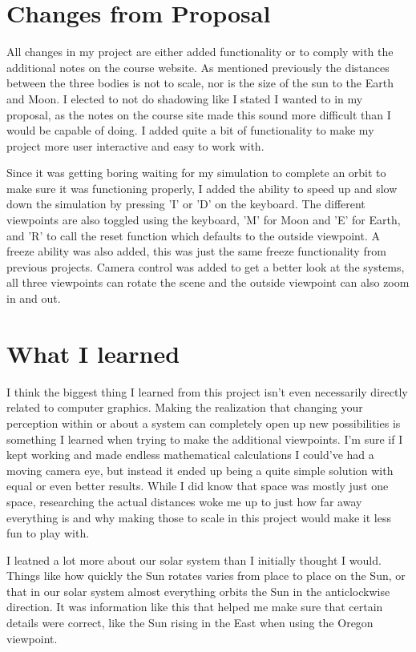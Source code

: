 \documentclass[12pt,serif,draftclsnofoot,onecolumn]{IEEEtran}
\begin{document}
	\section{Changes from Proposal}
	\par
			All changes in my project are either added functionality or to comply with the additional notes on the course website. As mentioned previously the distances between the three bodies is not to scale, nor is the size of the sun to the Earth and Moon. I elected to not do shadowing like I stated I wanted to in my proposal, as the notes on the course site made this sound more difficult than I would be capable of doing. I added quite a bit of functionality to make my project more user interactive and easy to work with.
	\newline
	\par
			Since it was getting boring waiting for my simulation to complete an orbit to make sure it was functioning properly, I added the ability to speed up and slow down the simulation by pressing 'I' or 'D' on the keyboard. The different viewpoints are also toggled using the keyboard, 'M' for Moon and 'E' for Earth, and 'R' to call the reset function which defaults to the outside viewpoint. A freeze ability was also added, this was just the same freeze functionality from previous projects. Camera control was added to get a better look at the systems, all three viewpoints can rotate the scene and the outside viewpoint can also zoom in and out.			
	\newline
	\section{What I learned}
	\par
			I think the biggest thing I learned from this project isn't even necessarily directly related to computer graphics. Making the realization that changing your perception within or about a system can completely open up new possibilities is something I learned when trying to make the additional viewpoints. I'm sure if I kept working and made endless mathematical calculations I could've had a moving camera eye, but instead it ended up being a quite simple solution with equal or even better results. While I did know that space was mostly just one space, researching the actual distances woke me up to just how far away everything is and why making those to scale in this project would make it less fun to play with.
	\newline
	\par
			I leatned a lot more about our solar system than I initially thought I would. Things like how quickly the Sun rotates varies from place to place on the Sun, or that in our solar system almost everything orbits the Sun in the anticlockwise direction. It was information like this that helped me make sure that certain details were correct, like the Sun rising in the East when using the Oregon viewpoint.
\end{document}
